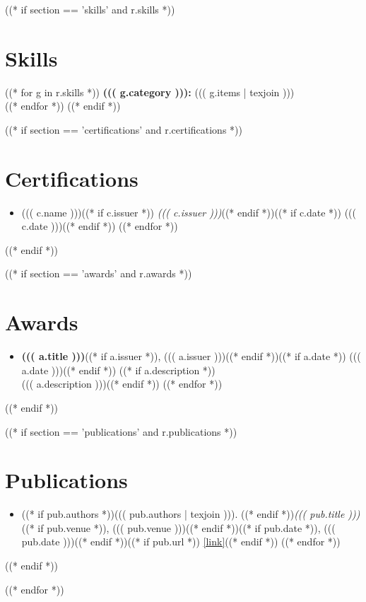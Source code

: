 ((* if section == 'skills' and r.skills *))
\section{Skills}
((* for g in r.skills *))
\textbf{((( g.category ))):} ((( g.items | texjoin )))\\[1pt]
((* endfor *))
((* endif *))

((* if section == 'certifications' and r.certifications *))
\section{Certifications}
\begin{itemize}
((* for c in r.certifications *))
  \item ((( c.name )))((* if c.issuer *)) \textemdash{} \textit{((( c.issuer )))}((* endif *))((* if c.date *)) \hfill ((( c.date )))((* endif *))
((* endfor *))
\end{itemize}
((* endif *))

((* if section == 'awards' and r.awards *))
\section{Awards}
\begin{itemize}
((* for a in r.awards *))
  \item \textbf{((( a.title )))}((* if a.issuer *)), ((( a.issuer )))((* endif *))((* if a.date *)) \hfill ((( a.date )))((* endif *))
  ((* if a.description *))\\ {\small ((( a.description )))}((* endif *))
((* endfor *))
\end{itemize}
((* endif *))

((* if section == 'publications' and r.publications *))
\section{Publications}
\begin{itemize}
((* for pub in r.publications *))
  \item ((* if pub.authors *))((( pub.authors | texjoin ))). ((* endif *))\textit{((( pub.title )))}((* if pub.venue *)), ((( pub.venue )))((* endif *))((* if pub.date *)), ((( pub.date )))((* endif *))((* if pub.url *)) \href{((( pub.url | url )))}{[link]}((* endif *))
((* endfor *))
\end{itemize}
((* endif *))

((* endfor *))
